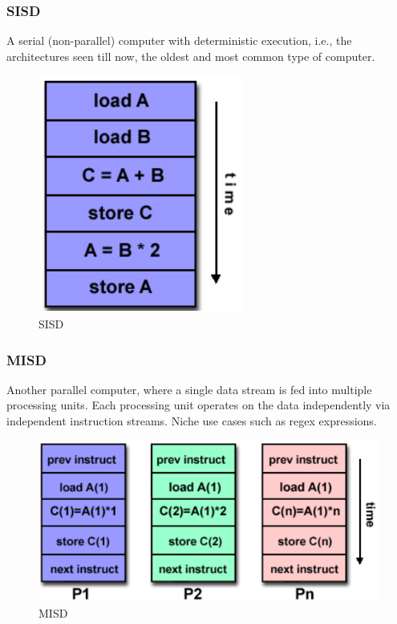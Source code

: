 \subsubsection{SISD}
A serial (non-parallel) computer with deterministic execution, i.e., the architectures seen till now, the oldest and
most common type of computer.
\begin{figure}[h]
    \centering
    \includegraphics[scale = 0.3]{images/sisd}
    \caption{SISD}
    \label{fig:sisd}
\end{figure}

\subsubsection{MISD}
Another parallel computer, where a single data stream is fed into multiple processing units.
Each processing unit operates on the data independently via independent instruction streams.
Niche use cases such as regex expressions.
\begin{figure}[H]
    \centering
    \includegraphics[scale = 0.3]{images/misd}
    \caption{MISD}
    \label{fig:misd}
\end{figure}

